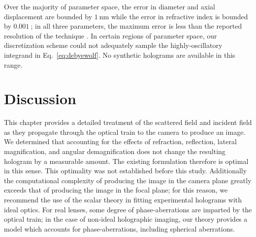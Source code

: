 Over the majority of parameter space, the error in diameter and
axial displacement are bounded by $\SI{1}{\nm}$ while the error
in refractive index is bounded by $\SI{0.001}{}$; in all three
parameters, the maximum error is less than the reported resolution of
the technique \cite{krishnatreya14}. In certain regions of parameter
space, our discretization scheme could not adequately sample the
highly-oscillatory integrand in Eq.~\eqref{eq:debyewolf}.
No synthetic holograms are available in this range.

\section{Discussion}

This chapter provides a detailed treatment of the scattered field
and incident field as they propagate through the optical train to the camera
to produce an image.
We determined that accounting for
the effects of refraction, reflection, lateral magnification, and angular
demagnification does not change the resulting hologram by a measurable amount.
The existing formulation therefore is optimal in this sense. This optimality
was not established before this study. Additionally
the computational complexity of producing
the image in the camera plane greatly exceeds that of producing the
image in the focal plane; for this reason, we recommend the use of the
scalar theory in fitting experimental holograms with ideal optics.
For real lenses, some degree of phase-aberrations are imparted by
the optical train; in the case of non-ideal holographic imaging,
our theory provides a model which accounts for phase-aberrations,
including spherical aberrations.
